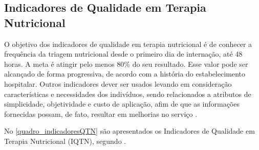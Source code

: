 \subsection{Indicadores de Qualidade em Terapia Nutricional} \label{subD-indicadores}
O objetivo dos indicadores de qualidade em terapia nutricional é de conhecer a frequência da triagem nutricional desde o primeiro dia de internação, até 48 horas. A meta é atingir pelo menos 80\% do seu resultado. Esse valor pode ser alcançado de forma progressiva, de acordo com a história do estabelecimento hospitalar. Outros indicadores dever ser usados levando em consideração características e necessidades dos indivíduos, sendo relacionados a atributos de simplicidade, objetividade e custo de aplicação, afim de que as informações fornecidas possam, de fato, resultar em melhorias no serviço \cite{manualnutricao2016}.

No \autoref{quadro_indicadoresQTN} são apresentados os Indicadores de Qualidade em Terapia Nutricional (IQTN), segundo .


